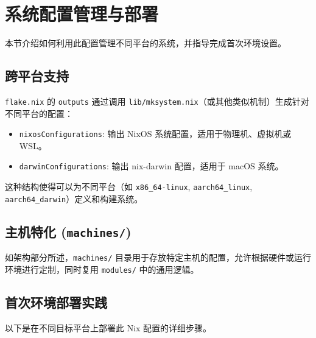 \documentclass[11pt, a4paper]{article} %
\begin{document}
\section{系统配置管理与部署}
本节介绍如何利用此配置管理不同平台的系统，并指导完成首次环境设置。

\subsection{跨平台支持}
\texttt{flake.nix} 的 \texttt{outputs} 通过调用 \texttt{lib/mksystem.nix}（或其他类似机制）生成针对不同平台的配置：
    \begin{itemize}
        \item \texttt{nixosConfigurations}: 输出 NixOS 系统配置，适用于物理机、虚拟机或 WSL。
        \item \texttt{darwinConfigurations}: 输出 nix-darwin 配置，适用于 macOS 系统。
    \end{itemize}
这种结构使得可以为不同平台（如 \texttt{x86\_64-linux}, \texttt{aarch64\_linux}, \texttt{aarch64\_darwin}）定义和构建系统。

\subsection{主机特化 (\texttt{machines/})}
如架构部分所述，\texttt{machines/} 目录用于存放特定主机的配置，允许根据硬件或运行环境进行定制，同时复用 \texttt{modules/} 中的通用逻辑。

\subsection{首次环境部署实践}
以下是在不同目标平台上部署此 Nix 配置的详细步骤。
\end{document}
